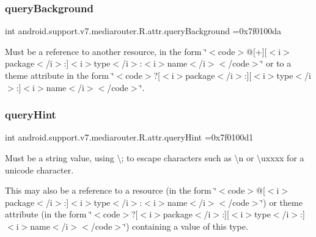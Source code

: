 \subsubsection{\texorpdfstring{query\+Background}{queryBackground}}
{\footnotesize\ttfamily int android.\+support.\+v7.\+mediarouter.\+R.\+attr.\+query\+Background =0x7f0100da\hspace{0.3cm}{\ttfamily [static]}}

Must be a reference to another resource, in the form \char`\"{}$<$code$>$@\mbox{[}+\mbox{]}\mbox{[}$<$i$>$package$<$/i$>$\+:\mbox{]}$<$i$>$type$<$/i$>$\+:$<$i$>$name$<$/i$>$$<$/code$>$\char`\"{} or to a theme attribute in the form \char`\"{}$<$code$>$?\mbox{[}$<$i$>$package$<$/i$>$\+:\mbox{]}\mbox{[}$<$i$>$type$<$/i$>$\+:\mbox{]}$<$i$>$name$<$/i$>$$<$/code$>$\char`\"{}. \mbox{\label{classandroid_1_1support_1_1v7_1_1mediarouter_1_1R_1_1attr_abeee02032ebb8d80eca5e69bb2f3e84b}} 
\subsubsection{\texorpdfstring{query\+Hint}{queryHint}}
{\footnotesize\ttfamily int android.\+support.\+v7.\+mediarouter.\+R.\+attr.\+query\+Hint =0x7f0100d1\hspace{0.3cm}{\ttfamily [static]}}

Must be a string value, using \textquotesingle{}\textbackslash{};\textquotesingle{} to escape characters such as \textquotesingle{}\textbackslash{}n\textquotesingle{} or \textquotesingle{}\textbackslash{}uxxxx\textquotesingle{} for a unicode character. 

This may also be a reference to a resource (in the form \char`\"{}$<$code$>$@\mbox{[}$<$i$>$package$<$/i$>$\+:\mbox{]}$<$i$>$type$<$/i$>$\+:$<$i$>$name$<$/i$>$$<$/code$>$\char`\"{}) or theme attribute (in the form \char`\"{}$<$code$>$?\mbox{[}$<$i$>$package$<$/i$>$\+:\mbox{]}\mbox{[}$<$i$>$type$<$/i$>$\+:\mbox{]}$<$i$>$name$<$/i$>$$<$/code$>$\char`\"{}) containing a value of this type. \mbox{\label{classandroid_1_1support_1_1v7_1_1mediarouter_1_1R_1_1attr_a1879851274fd4f59cc148d48886e3dce}} 
